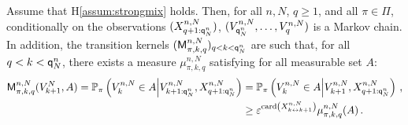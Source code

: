 \begin{lemma}
\label{lem:minorization}
Assume that H\ref{assum:strongmix} holds. Then, for all $n,N$, $q\ge 1$, and all $\pi\in\Pi$, conditionally on the observations $(X_{q+1:{\mathsf{q}}^{n}_{N}}^{n,N})$, $(V_{{\mathsf{q}}^{n}_{N}}^{n,N},\ldots,V_q^{n,N})$ is a Markov chain.
In addition,  the transition kernels $(\mathsf{M}^{n,N}_{\pi,k,q})_{q< k <{\mathsf{q}}^{n}_{N}}$ are such that, for all $q< k < {\mathsf{q}}^{n}_{N}$, there exists a measure $\mu^{n,N}_{\pi,k,q}$ satisfying for all measurable set $A$:
\begin{align*}
\mathsf{M}^{n,N}_{\pi,k,q}(V^N_{k+1},A) = \mathbb{P}_{\pi}\left(V^{n,N}_{k}\in A\middle|V^{n,N}_{k+1:{\mathsf{q}}^{n}_{N}},X_{q+1:{\mathsf{q}}^{n}_{N}}^{n,N}\right)  &= \mathbb{P}_{\pi}\left(V^{n,N}_{k}\in A\middle|V^{n,N}_{k+1},X_{q+1:{\mathsf{q}}^{n}_{N}}^{n,N}\right)\,,\\
&\ge \varepsilon^{\mathrm{card}\left(X^{n,N}_{k\leftrightarrow k+1}\right)} \mu^{n,N}_{\pi,k,q}(A)\,.
\end{align*}
\end{lemma}
